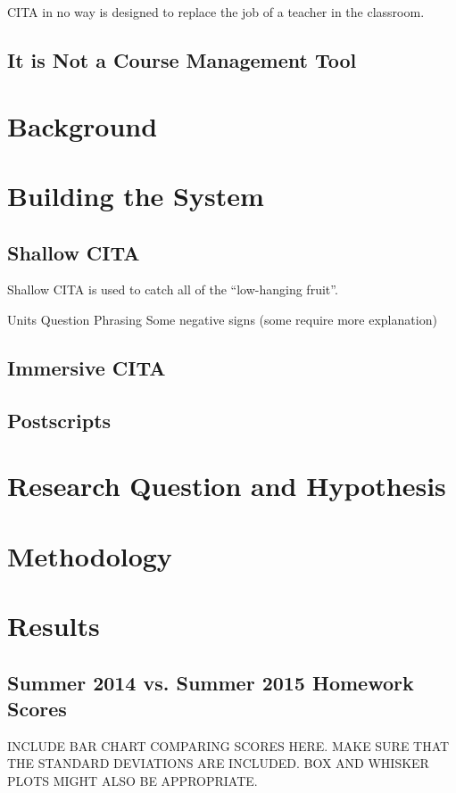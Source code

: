 CITA in no way is designed to replace the job of a teacher in the classroom.

\subsection{It is Not a Course Management Tool}



\section{Background}

\section{Building the System}

\subsection{Shallow CITA}

Shallow CITA is used to catch all of the ``low-hanging fruit''.

Units
Question Phrasing
Some negative signs (some require more explanation)

\subsection{Immersive CITA}

\subsection{Postscripts}

\section{Research Question and Hypothesis}

\section{Methodology}

\section{Results}

\subsection{Summer 2014 vs. Summer 2015 Homework Scores}

INCLUDE BAR CHART COMPARING SCORES HERE. MAKE SURE THAT THE STANDARD DEVIATIONS ARE INCLUDED. BOX AND WHISKER PLOTS MIGHT ALSO BE APPROPRIATE.
